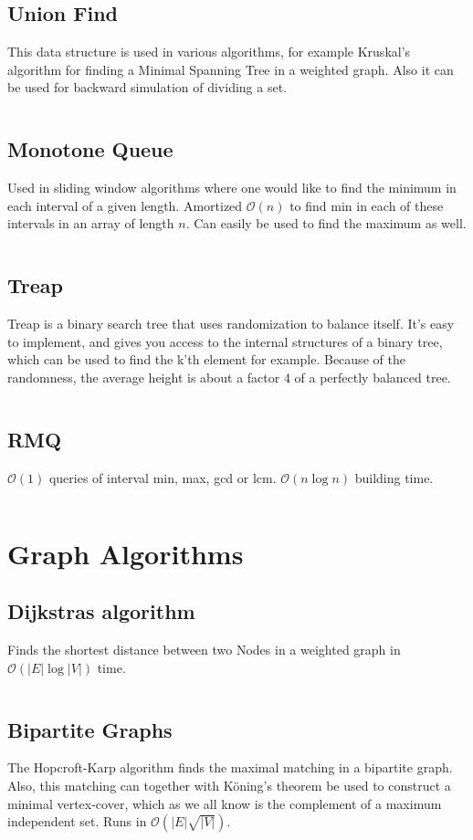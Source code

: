 \documentclass[8pt,a4paper,landscape,oneside]{amsart}
\newcommand{\codej}[1]{\inputminted[fontsize=\large,tabsize=2,baselinestretch=1]{java}{code/#1}}
\newcommand{\codep}[1]{\inputminted[fontsize=\large,tabsize=2,baselinestretch=1]{py}{code/#1}}
\newcommand{\bigO}{\mathcal{O}}
\begin{document}
\begin{multicols*}{2}
\begin{large}
    \subsection{Union Find}
        This data structure is used in various algorithms, for example Kruskal's algorithm for finding a Minimal Spanning Tree in a weighted graph. Also it can be used for backward simulation of dividing a set.
        \codej{DS/UF.java}
    \subsection{Monotone Queue}
        Used in sliding window algorithms where one would like to find the minimum in each interval of a given length. Amortized $\bigO(n)$ to find min in each of these intervals in an array of length $n$. Can easily be used to find the maximum as well.
        \codej{DS/MinMonQue.java}
    \subsection{Treap}
        Treap is a binary search tree that uses randomization to balance itself. 
        It's easy to implement, and gives you access to the internal structures of a binary tree, 
        which can be used to find the k'th element for example. Because of the randomness, the average height is about a factor 4 of a perfectly balanced tree.
        \codej{DS/Treap.java}
    \subsection{RMQ}
        $\bigO(1)$ queries of interval min, max, gcd or lcm. $\bigO(n \log n)$ building time.
        \codep{DS/RMQ.py}
\section{Graph Algorithms}
    \subsection{Dijkstras algorithm}
        Finds the shortest distance between two Nodes in a weighted graph in $\bigO (|E| \log{|V|})$ time.
        \codep{Graphs/dijkstra.py}
    \subsection{Bipartite Graphs}
        The Hopcroft-Karp algorithm finds the maximal matching in a bipartite graph. Also, this matching can together with Köning's theorem be used to construct a minimal vertex-cover, which as we all know is the complement of a maximum independent set. Runs in $\bigO (|E|\sqrt{|V|})$. 
        \codej{Graphs/BiGraph.java}

\end{large}
\end{multicols*}
\end{document}

